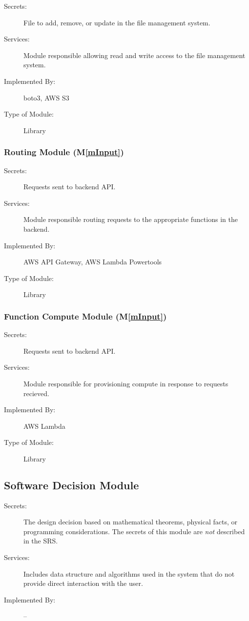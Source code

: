 \documentclass[12pt, titlepage]{article}
\newcommand{\mref}[1]{M\ref{#1}}
\begin{document}
\begin{description}
  \item[Secrets:] File to add, remove, or update in the file management system.
  \item[Services:] Module responsible allowing read and write access
    to the file management system.
  \item[Implemented By:] boto3, AWS S3
  \item[Type of Module:] Library
\end{description}

\subsubsection{Routing Module (\mref{mInput})}

\begin{description}
  \item[Secrets:] Requests sent to backend API.
  \item[Services:] Module responsible routing requests to the
    appropriate functions in the backend.
  \item[Implemented By:] AWS API Gateway, AWS Lambda Powertools
  \item[Type of Module:] Library
\end{description}

\subsubsection{Function Compute Module (\mref{mInput})}

\begin{description}
  \item[Secrets:] Requests sent to backend API.
  \item[Services:] Module responsible for provisioning compute in
    response to requests recieved.
  \item[Implemented By:] AWS Lambda
  \item[Type of Module:] Library
\end{description}

\subsection{Software Decision Module}

\begin{description}
  \item[Secrets:] The design decision based on mathematical theorems, physical
    facts, or programming considerations. The secrets of this module are
    \emph{not} described in the SRS.
  \item[Services:] Includes data structure and algorithms used in the
    system that
    do not provide direct interaction with the user.
  \item[Implemented By:] --
\end{description}
\end{document}
